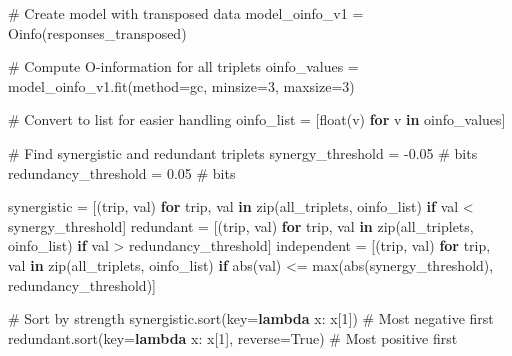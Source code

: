 \documentclass[
  11pt,
  letterpaper,
  oneside,
  openany]{book}
\newenvironment{Shaded}{\begin{snugshade}}{\end{snugshade}}
\newcommand{\BuiltInTok}[1]{\textcolor[rgb]{0.00,0.23,0.31}{#1}}
\newcommand{\CommentTok}[1]{\textcolor[rgb]{0.37,0.37,0.37}{#1}}
\newcommand{\ControlFlowTok}[1]{\textcolor[rgb]{0.00,0.23,0.31}{\textbf{#1}}}
\newcommand{\DecValTok}[1]{\textcolor[rgb]{0.68,0.00,0.00}{#1}}
\newcommand{\FloatTok}[1]{\textcolor[rgb]{0.68,0.00,0.00}{#1}}
\newcommand{\KeywordTok}[1]{\textcolor[rgb]{0.00,0.23,0.31}{\textbf{#1}}}
\newcommand{\NormalTok}[1]{\textcolor[rgb]{0.00,0.23,0.31}{#1}}
\newcommand{\OperatorTok}[1]{\textcolor[rgb]{0.37,0.37,0.37}{#1}}
\newcommand{\StringTok}[1]{\textcolor[rgb]{0.13,0.47,0.30}{#1}}
\newcommand{\VariableTok}[1]{\textcolor[rgb]{0.07,0.07,0.07}{#1}}
\begin{document}
\begin{Shaded}
\begin{Highlighting}[]
\CommentTok{\# Create model with transposed data}
\NormalTok{model\_oinfo\_v1 }\OperatorTok{=}\NormalTok{ Oinfo(responses\_transposed)}

\CommentTok{\# Compute O{-}information for all triplets}
\NormalTok{oinfo\_values }\OperatorTok{=}\NormalTok{ model\_oinfo\_v1.fit(method}\OperatorTok{=}\StringTok{\textquotesingle{}gc\textquotesingle{}}\NormalTok{, minsize}\OperatorTok{=}\DecValTok{3}\NormalTok{, maxsize}\OperatorTok{=}\DecValTok{3}\NormalTok{)}

\CommentTok{\# Convert to list for easier handling}
\NormalTok{oinfo\_list }\OperatorTok{=}\NormalTok{ [}\BuiltInTok{float}\NormalTok{(v) }\ControlFlowTok{for}\NormalTok{ v }\KeywordTok{in}\NormalTok{ oinfo\_values]}

\CommentTok{\# Find synergistic and redundant triplets}
\NormalTok{synergy\_threshold }\OperatorTok{=} \OperatorTok{{-}}\FloatTok{0.05}  \CommentTok{\# bits}
\NormalTok{redundancy\_threshold }\OperatorTok{=} \FloatTok{0.05}  \CommentTok{\# bits}

\NormalTok{synergistic }\OperatorTok{=}\NormalTok{ [(trip, val) }\ControlFlowTok{for}\NormalTok{ trip, val }\KeywordTok{in} \BuiltInTok{zip}\NormalTok{(all\_triplets, oinfo\_list) }\ControlFlowTok{if}\NormalTok{ val }\OperatorTok{\textless{}}\NormalTok{ synergy\_threshold]}
\NormalTok{redundant }\OperatorTok{=}\NormalTok{ [(trip, val) }\ControlFlowTok{for}\NormalTok{ trip, val }\KeywordTok{in} \BuiltInTok{zip}\NormalTok{(all\_triplets, oinfo\_list) }\ControlFlowTok{if}\NormalTok{ val }\OperatorTok{\textgreater{}}\NormalTok{ redundancy\_threshold]}
\NormalTok{independent }\OperatorTok{=}\NormalTok{ [(trip, val) }\ControlFlowTok{for}\NormalTok{ trip, val }\KeywordTok{in} \BuiltInTok{zip}\NormalTok{(all\_triplets, oinfo\_list) }
               \ControlFlowTok{if} \BuiltInTok{abs}\NormalTok{(val) }\OperatorTok{\textless{}=} \BuiltInTok{max}\NormalTok{(}\BuiltInTok{abs}\NormalTok{(synergy\_threshold), redundancy\_threshold)]}

\CommentTok{\# Sort by strength}
\NormalTok{synergistic.sort(key}\OperatorTok{=}\KeywordTok{lambda}\NormalTok{ x: x[}\DecValTok{1}\NormalTok{])  }\CommentTok{\# Most negative first}
\NormalTok{redundant.sort(key}\OperatorTok{=}\KeywordTok{lambda}\NormalTok{ x: x[}\DecValTok{1}\NormalTok{], reverse}\OperatorTok{=}\VariableTok{True}\NormalTok{)  }\CommentTok{\# Most positive first}


\end{Highlighting}
\end{Shaded}
\end{document}
